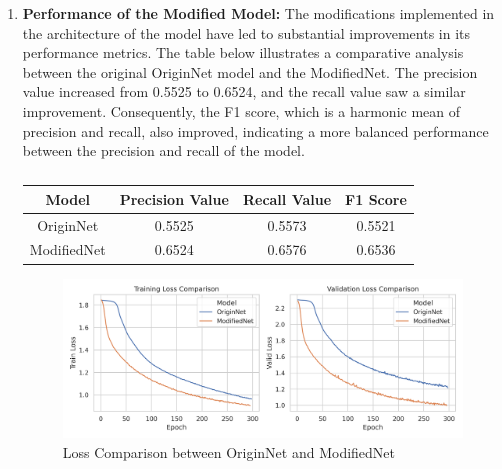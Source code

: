 \documentclass[conference]{IEEEtran}
\begin{document}
\begin{enumerate}
		\item \textbf{Performance of the Modified Model:}
		    The modifications implemented in the architecture of the model have led to substantial improvements in its performance metrics. The table below illustrates a comparative analysis between the original OriginNet model and the ModifiedNet. The precision value increased from 0.5525 to 0.6524, and the recall value saw a similar improvement. Consequently, the F1 score, which is a harmonic mean of precision and recall, also improved, indicating a more balanced performance between the precision and recall of the model.
		
		\begin{table}[h]
			\centering
			\begin{tabular}{|c|c|c|c|}
				\hline
				\textbf{Model} & \textbf{Precision Value} & \textbf{Recall Value} & \textbf{F1 Score} \\ \hline
				OriginNet      & 0.5525                   & 0.5573                & 0.5521            \\ \hline
				ModifiedNet    & 0.6524                   & 0.6576                & 0.6536            \\ \hline
			\end{tabular}
			\caption{}
			\label{tab:my-table}
		\end{table}
		
		
	\begin{figure}[htbp]
		\centerline{\includegraphics[width=\columnwidth]{images/loss_comparison.png}}
		\caption{Loss Comparison between OriginNet and ModifiedNet}
		\label{fig:loss_comparison}
	\end{figure}
	

\end{enumerate}
\end{document}
